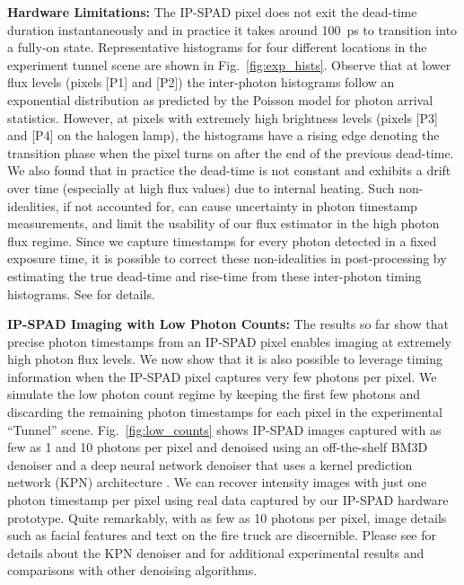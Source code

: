 \smallskip
\noindent\textbf{Hardware Limitations:}
The IP-SPAD pixel does not exit the dead-time duration instantaneously and in
practice it takes around \SI{100}{\ps} to transition into a fully-on state.
Representative histograms for four different locations in the experiment tunnel
scene are shown in Fig.~\ref{fig:exp_hists}. Observe that at lower flux levels
(pixels [P1] and [P2]) the inter-photon histograms follow an exponential
distribution as predicted by the Poisson model for photon arrival statistics.
However, at pixels with extremely high brightness levels (pixels [P3] and [P4]
on the halogen lamp), the histograms have a rising edge denoting the transition
phase when the pixel turns on after the end of the previous dead-time.
We also found that in practice the dead-time is not constant and exhibits a
drift over time (especially at high flux values) due to internal heating.  Such
non-idealities, if not accounted for, can cause uncertainty in photon timestamp
measurements, and limit the usability of our flux estimator in the high photon
flux regime.  Since we capture timestamps for every photon detected in a fixed
exposure time, it is possible to correct these non-idealities in
post-processing by estimating the true dead-time and rise-time from these
inter-photon timing histograms. See \nolink{\ref{suppl:dead time drift}} for
details.

\smallskip
\noindent\textbf{IP-SPAD Imaging with Low Photon Counts:}
The results so far show that precise photon timestamps from an IP-SPAD
pixel enables imaging at extremely high photon flux levels. We now show that it
is also possible to leverage timing information when the IP-SPAD pixel captures
very few photons per pixel. We simulate the low photon count regime by keeping
the first few photons and discarding the remaining photon timestamps for each
pixel in the experimental ``Tunnel'' scene. Fig.~\ref{fig:low_counts} shows
IP-SPAD images captured with as few as 1 and 10 photons per pixel and denoised
using an off-the-shelf BM3D denoiser and a deep neural network denoiser that
uses a kernel prediction network (KPN) architecture \cite{burstkpn_2018}. We
can recover intensity images with just one photon timestamp per pixel using
real data captured by our IP-SPAD hardware prototype.  Quite remarkably, with
as few as 10 photons per pixel, image details such as facial features and text
on the fire truck are discernible. Please see
\nolink{\ref{suppl:timing_usefulness}} for details about the KPN denoiser and
\nolink{\ref{suppl:additional_results}} for additional experimental results and
comparisons with other denoising algorithms.

